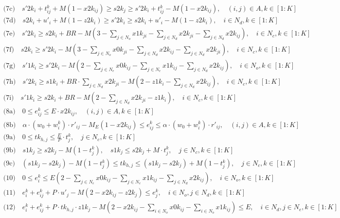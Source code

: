 \documentclass[11pt]{ctexart}
\begin{document}
\begin{align*}
&\text{(7c)} \quad s'2k_i + t^k_{ij} + M(1 - x2k_{ij}) \geq s2k_j \geq s'2k_i + t^k_{ij} - M(1 - x2k_{ij}), \quad (i, j) \in A, k \in [1 : K] \\
&\text{(7d)} \quad s2k_i + u'_i + M(1 - z2k_i) \geq s'2k_i \geq s2k_i + u'_i - M(1 - z2k_i), \quad i \in N_d, k \in [1 : K] \\
&\text{(7e)} \quad s'2k_i \geq s2k_i + BR - M(3 - \sum_{j \in N_o} x1k_{ji} - \sum_{j \in N_d} x2k_{ji} - \sum_{j \in N_d} x2k_{ij}), \quad i \in N_c, k \in [1 : K] \\
&\text{(7f)} \quad s2k_i \geq s'2k_i - M(3 - \sum_{j \in N_o} x0k_{ji} - \sum_{j \in N_d} x2k_{ij} - \sum_{j \in N_d} x2k_{ji}), \quad i \in N_c, k \in [1 : K] \\
&\text{(7g)} \quad s'1k_i \geq s'2k_i - M(2 - \sum_{j \in N_e} x0k_{ij} - \sum_{j \in N_e} x1k_{ij} - \sum_{j \in N_d} x2k_{ij}), \quad i \in N_o, k \in [1 : K] \\
&\text{(7h)} \quad s'2k_i \geq s1k_i + BR \cdot \sum_{j \in N_d} x2k_{ji} - M(2 - z1k_i - \sum_{j \in N_d} x2k_{ij}), \quad i \in N_c, k \in [1 : K] \\
&\text{(7i)} \quad s'1k_i \geq s2k_i + BR - M(2 - \sum_{j \in N_d} x2k_{ji} - z1k_i), \quad i \in N_c, k \in [1 : K] \\
&\text{(8a)} \quad 0 \leq e^k_{ij} \leq E \cdot x2k_{ij}, \quad (i, j) \in A, k \in [1 : K] \\
&\text{(8b)} \quad \alpha \cdot (w_0 + w^k_i) \cdot r'_{ij} - M_E(1 - x2k_{ij}) \leq e^k_{ij} \leq \alpha \cdot (w_0 + w^k_i) \cdot r'_{ij}, \quad (i, j) \in A, k \in [1 : K] \\
&\text{(9a)} \quad 0 \leq tk_{h,j} \leq \frac{E}{P} \cdot t^k_j, \quad j \in N_c, k \in [1 : K] \\
&\text{(9b)} \quad s1k_j \geq s2k_j - M(1 - t^k_j), \quad s1k_j \leq s2k_j + M \cdot t^k_j, \quad j \in N_c, k \in [1 : K] \\
&\text{(9c)} \quad (s1k_j - s2k_j) - M(1 - t^k_j) \leq tk_{h,j} \leq (s1k_j - s2k_j) + M(1 - t^k_j), \quad j \in N_c, k \in [1 : K] \\
&\text{(10)} \quad 0 \leq e^k_i \leq E(2 - \sum_{j \in N_e} x0k_{ij} - \sum_{j \in N_e} x1k_{ij} - \sum_{j \in N_d} x2k_{ij}), \quad i \in N_o, k \in [1 : K] \\
&\text{(11)} \quad e^k_i + e^k_{ij} + P \cdot u'_j - M(2 - x2k_{ij} - z2k_j) \leq e^k_j, \quad i \in N_o, j \in N_d, k \in [1 : K] \\
&\text{(12)} \quad e^k_i + e^k_{ij} + P \cdot tk_{h,j} \cdot z1k_j - M(2 - x2k_{ij} - \sum_{i \in N_o} x0k_{ij} - \sum_{i \in N_o} x1k_{ij}) \leq E, \quad i \in N_d, j \in N_e, k \in [1 : K] \\

\end{align*}
\end{document}

